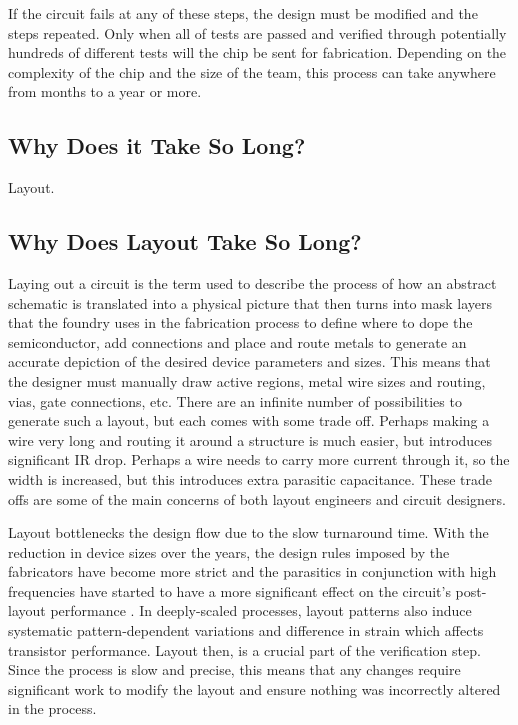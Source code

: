 
If the circuit fails at any of these steps, the design must be modified and the steps repeated. Only when all of tests are passed and verified through potentially hundreds of different tests will the chip be sent for fabrication. Depending on the complexity of the chip and the size of the team, this process can take anywhere from months to a year or more.
\subsection{Why Does it Take So Long?}
Layout.

\subsection{Why Does Layout Take So Long?}
Laying out a circuit is the term used to describe the process of how an abstract schematic is translated into a physical picture that then turns into mask layers that the foundry uses in the fabrication process to define where to dope the semiconductor, add connections and place and route metals to generate an accurate depiction of the desired device parameters and sizes. This means that the designer must manually draw active regions, metal wire sizes and routing, vias, gate connections, etc. There are an infinite number of possibilities to generate such a layout, but each comes with some trade off. Perhaps making a wire very long and routing it around a structure is much easier, but introduces significant IR drop. Perhaps a wire needs to carry more current through it, so the width is increased, but this introduces extra parasitic capacitance. These trade offs are some of the main concerns of both layout engineers and circuit designers. 

Layout bottlenecks the design flow due to the slow turnaround time. With the reduction in device sizes over the years, the design rules imposed by the fabricators have become more strict and the parasitics in conjunction with high frequencies have started to have a more significant effect on the circuit's post-layout performance \cite{allen_practice_2004} \cite{lourenco_layout-aware_2015}. In deeply-scaled processes, layout patterns also induce systematic pattern-dependent variations and difference in strain which affects transistor performance. Layout then, is a crucial part of the verification step. Since the process is slow and precise, this means that any changes require significant work to modify the layout and ensure nothing was incorrectly altered in the process.

